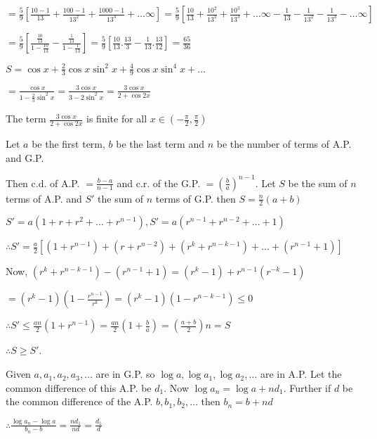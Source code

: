   $= \frac{5}{9}\left[\frac{10 - 1}{13} + \frac{100 - 1}{13^2} + \frac{1000 - 1}{13^3} + \ldots
  \infty\right] = \frac{5}{9}\left[\frac{10}{13} + \frac{10^2}{13^2} + \frac{10^3}{13^3} + \ldots \infty - \frac{1}{13} - \frac{1}{13^2} -
  \frac{1}{13^3} - \ldots \infty\right]$

  $= \frac{5}{9}\left[\frac{\frac{10}{13}}{1 - \frac{10}{13}} - \frac{\frac{1}{13}}{1 -
    \frac{1}{13}}\right]= \frac{5}{9}\left[\frac{10}{13}.\frac{13}{3} - \frac{1}{13}.\frac{13}{12}\right]=
  \frac{65}{36}$
\item $S = \cos x + \frac{2}{3}\cos x\sin^2x + \frac{4}{9}\cos x\sin^4x + \ldots$

  $= \frac{\cos x}{1 - \frac{2}{3}\sin^2x} = \frac{3\cos x}{3 - 2\sin^2x} = \frac{3\cos x}{2 + \cos 2x}$

  The term $\frac{3\cos x}{2 + \cos 2x}$ is finite for all $x\in \left(-\frac{\pi}{2},\frac{\pi}{2}\right)$

\item Let $a$ be the first term, $b$ be the last term and $n$ be the number of terms of A.P. and G.P.

  Then c.d. of A.P. $= \frac{b - a}{n - 1}$ and c.r. of the G.P. $= \left(\frac{b}{a}\right)^{n - 1}.$ Let $S$ be the sum of $n$
  terms of A.P. and $S'$ the sum of $n$ terms of G.P. then $S = \frac{n}{2}(a + b)$

  $S' = a(1 + r + r^2 + \ldots + r^{n - 1}), S' = a(r^{n - 1} + r^{n - 2} + \ldots + 1)$

  $\therefore S' = \frac{a}{2}[(1 + r^{n - 1}) + (r + r^{n - 2}) + (r^k + r^{n - k - 1}) + \ldots + (r^{n - 1} + 1)]$

  Now, $(r^k + r^{n - k - 1}) - (r^{n - 1} + 1) = (r^k - 1) + r^{n - 1}(r^{-k} - 1)$

  $= (r^k - 1)\left(1 - \frac{r^{n - 1}}{r^k}\right) = (r^k - 1)(1 - r^{n - k - 1})\leq 0$

  $\therefore S'\leq \frac{an}{2}(1 + r^{n - 1}) = \frac{an}{2}\left(1 + \frac{b}{a}\right) = \left(\frac{a
    + b}{2}\right)n = S$

  $\therefore S \geq S'$.
\item Given $a, a_1, a_2, a_3, \ldots$ are in G.P. so $\log a, \log a_1, \log a_2, \ldots$ are in A.P. Let the
  common difference of this A.P. be $d_1.$ Now $\log a_n = \log a + nd_1.$ Further if $d$ be the common difference of the A.P. $b,
  b_1, b_2, \ldots$ then $b_n = b + nd$

  $\therefore \frac{\log a_n - \log a}{b_n - b} = \frac{nd_1}{nd} = \frac{d_1}{d}$

